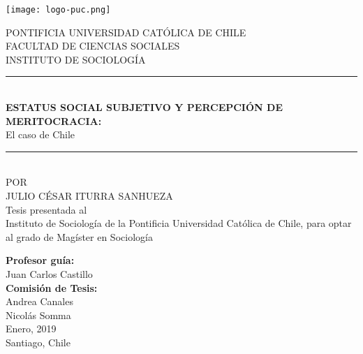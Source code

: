 \newcommand{\HRule}[1]{\rule{\linewidth}{#1}}
\renewcommand{\baselinestretch}{1.15}
\begin{titlepage}
\begin{center}

\begin{minipage}{0.18\textwidth}%
	\texttt{[image: logo-puc.png]}
\end{minipage}%
\hfill	
\begin{minipage}{0.8\textwidth} 
{\normalsize 	 PONTIFICIA UNIVERSIDAD CATÓLICA DE CHILE \\ FACULTAD DE CIENCIAS SOCIALES \\ INSTITUTO DE SOCIOLOGÍA }
\end{minipage}

\vspace{1cm}

		\HRule{2pt} \\
		\LARGE \textbf{\uppercase{Estatus Social Subjetivo y Percepción de Meritocracia: \\ }} 
		{El caso de Chile}
		\HRule{2pt} \\ 
		[0.5cm]

\normalsize POR\\
\vspace{0.5cm}
\normalsize \uppercase{Julio César Iturra Sanhueza} \\

\vspace{0.5cm}
\normalsize Tesis presentada al\\ Instituto de Sociología de la Pontificia 
Universidad Católica de Chile, 
para optar al grado de Magíster en Sociología 

\vspace{1.5cm}
\normalsize \textbf{Profesor guía:} \\
Juan Carlos Castillo\\
\textbf{Comisión de Tesis:} \\	 
Andrea Canales\\
Nicolás Somma\\
\vspace{1.0cm}
Enero, 2019 \\
Santiago, Chile
\date{}

\end{center}	
\end{titlepage}	
